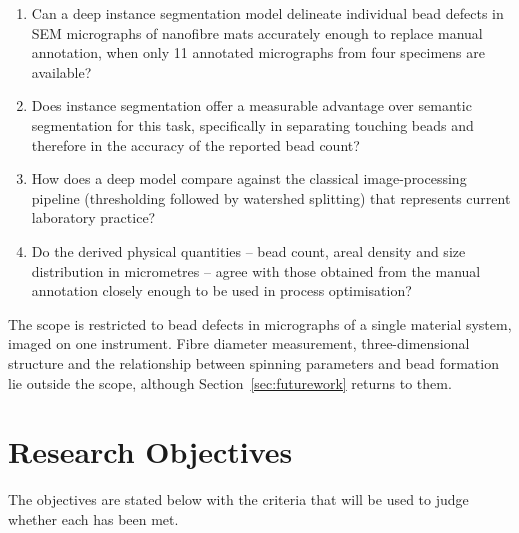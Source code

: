 \begin{enumerate}
    \item Can a deep instance segmentation model delineate individual bead defects
    in SEM micrographs of nanofibre mats accurately enough to replace manual
    annotation, when only 11 annotated micrographs from four specimens are available?

    \item Does instance segmentation offer a measurable advantage over semantic
    segmentation for this task, specifically in separating touching beads and
    therefore in the accuracy of the reported bead count?

    \item How does a deep model compare against the classical image-processing
    pipeline (thresholding followed by watershed splitting) that represents current
    laboratory practice?

    \item Do the derived physical quantities -- bead count, areal density and size
    distribution in micrometres -- agree with those obtained from the manual
    annotation closely enough to be used in process optimisation?
\end{enumerate}

The scope is restricted to bead defects in micrographs of a single material system,
imaged on one instrument. Fibre diameter measurement, three-dimensional structure
and the relationship between spinning parameters and bead formation lie outside the
scope, although Section~\ref{sec:futurework} returns to them.

\section{Research Objectives}

The objectives are stated below with the criteria that will be used to judge whether
each has been met.

